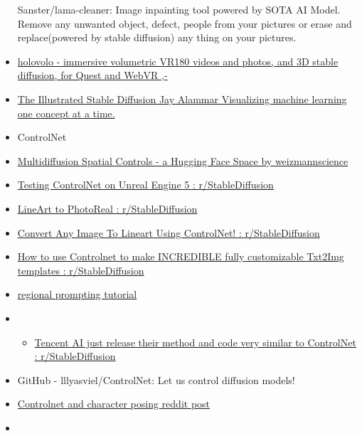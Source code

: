 \begin{itemize}
{  Sanster/lama-cleaner: Image inpainting tool powered by SOTA AI Model.
  Remove any unwanted object, defect, people from your pictures or erase
  and replace(powered by stable diffusion) any thing on your pictures.}
\item
  \href{https://holovolo.tv}{holovolo - immersive volumetric VR180
  videos and photos, and 3D stable diffusion, for Quest and WebVR ,-}
\item
  \href{https://jalammar.github.io/illustrated-stable-diffusion/}{The
  Illustrated Stable Diffusion Jay Alammar Visualizing machine learning
  one concept at a time.}
\item
  ControlNet
\item
  \href{https://huggingface.co/spaces/weizmannscience/multidiffusion-region-based}{Multidiffusion
  Spatial Controls - a Hugging Face Space by weizmannscience}
\item
  \href{https://www.reddit.com/r/StableDiffusion/comments/11fpcb1/testing_controlnet_on_unreal_engine_5/}{Testing
  ControlNet on Unreal Engine 5 : r/StableDiffusion}
\item
  \href{https://www.reddit.com/r/StableDiffusion/comments/11mzdxm/lineart_to_photoreal/}{LineArt
  to PhotoReal : r/StableDiffusion}
\item
  \href{https://www.reddit.com/r/StableDiffusion/comments/11mwzsz/convert_any_image_to_lineart_using_controlnet/}{Convert
  Any Image To Lineart Using ControlNet! : r/StableDiffusion}
\item
  \href{https://www.reddit.com/r/StableDiffusion/comments/11ah3nv/how_to_use_controlnet_to_make_incredible_fully/}{How
  to use Controlnet to make INCREDIBLE fully customizable Txt2Img
  templates : r/StableDiffusion}
\item
  \href{https://www.youtube.com/watch?v=vZ3W62dxuXI}{regional prompting
  tutorial}
\item
  \begin{itemize}
   
  \item
    \href{https://www.reddit.com/r/StableDiffusion/comments/1148x38/tencent_ai_just_release_their_method_and_code/}{Tencent
    AI just release their method and code very similar to ControlNet :
    r/StableDiffusion}
  \end{itemize}
\item
  GitHub - lllyasviel/ControlNet: Let us control diffusion models!
\item
  \href{https://www.reddit.com/r/StableDiffusion/comments/11owo31/something_that_might_help_ppl_with_posing/}{Controlnet
  and character posing reddit post}
\item
  \begin{itemize}
   

\end{itemize}
\end{itemize}
